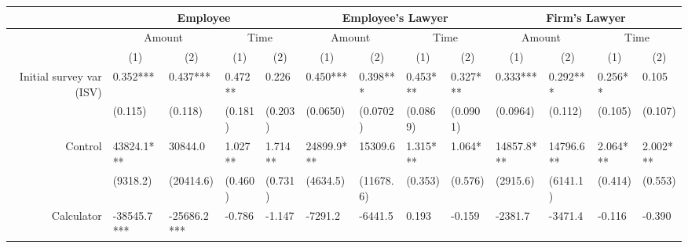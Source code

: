 \begin{tabular}{rrrrrrrrrrrrr}
\toprule
      & \multicolumn{4}{c}{Employee}  & \multicolumn{4}{c}{Employee's Lawyer} & \multicolumn{4}{c}{Firm's Lawyer} \\
\midrule
      & \multicolumn{2}{c}{Amount} & \multicolumn{2}{c}{Time} & \multicolumn{2}{c}{Amount} & \multicolumn{2}{c}{Time} & \multicolumn{2}{c}{Amount} & \multicolumn{2}{c}{Time} \\
      & \multicolumn{1}{c}{(1)} & \multicolumn{1}{c}{(2)} & \multicolumn{1}{c}{(1)} & \multicolumn{1}{c}{(2)} & \multicolumn{1}{c}{(1)} & \multicolumn{1}{c}{(2)} & \multicolumn{1}{c}{(1)} & \multicolumn{1}{c}{(2)} & \multicolumn{1}{c}{(1)} & \multicolumn{1}{c}{(2)} & \multicolumn{1}{c}{(1)} & \multicolumn{1}{c}{(2)} \\
Initial survey var (ISV) & \multicolumn{1}{l}{0.352***} & \multicolumn{1}{l}{0.437***} & \multicolumn{1}{l}{0.472**} & \multicolumn{1}{l}{0.226} & \multicolumn{1}{l}{0.450***} & \multicolumn{1}{l}{0.398***} & \multicolumn{1}{l}{0.453***} & \multicolumn{1}{l}{0.327***} & \multicolumn{1}{l}{0.333***} & \multicolumn{1}{l}{0.292***} & \multicolumn{1}{l}{0.256**} & \multicolumn{1}{l}{0.105} \\
      & \multicolumn{1}{l}{(0.115)} & \multicolumn{1}{l}{(0.118)} & \multicolumn{1}{l}{(0.181)} & \multicolumn{1}{l}{(0.203)} & \multicolumn{1}{l}{(0.0650)} & \multicolumn{1}{l}{(0.0702)} & \multicolumn{1}{l}{(0.0869)} & \multicolumn{1}{l}{(0.0901)} & \multicolumn{1}{l}{(0.0964)} & \multicolumn{1}{l}{(0.112)} & \multicolumn{1}{l}{(0.105)} & \multicolumn{1}{l}{(0.107)} \\
Control & \multicolumn{1}{l}{43824.1***} & \multicolumn{1}{l}{30844.0} & \multicolumn{1}{l}{1.027**} & \multicolumn{1}{l}{1.714**} & \multicolumn{1}{l}{24899.9***} & \multicolumn{1}{l}{15309.6} & \multicolumn{1}{l}{1.315***} & \multicolumn{1}{l}{1.064*} & \multicolumn{1}{l}{14857.8***} & \multicolumn{1}{l}{14796.6**} & \multicolumn{1}{l}{2.064***} & \multicolumn{1}{l}{2.002***} \\
      & \multicolumn{1}{l}{(9318.2)} & \multicolumn{1}{l}{(20414.6)} & \multicolumn{1}{l}{(0.460)} & \multicolumn{1}{l}{(0.731)} & \multicolumn{1}{l}{(4634.5)} & \multicolumn{1}{l}{(11678.6)} & \multicolumn{1}{l}{(0.353)} & \multicolumn{1}{l}{(0.576)} & \multicolumn{1}{l}{(2915.6)} & \multicolumn{1}{l}{(6141.1)} & \multicolumn{1}{l}{(0.414)} & \multicolumn{1}{l}{(0.553)} \\
Calculator & \multicolumn{1}{l}{-38545.7***} & \multicolumn{1}{l}{-25686.2***} & \multicolumn{1}{l}{-0.786} & \multicolumn{1}{l}{-1.147} & \multicolumn{1}{l}{-7291.2} & \multicolumn{1}{l}{-6441.5} & \multicolumn{1}{l}{0.193} & \multicolumn{1}{l}{-0.159} & \multicolumn{1}{l}{-2381.7} & \multicolumn{1}{l}{-3471.4} & \multicolumn{1}{l}{-0.116} & \multicolumn{1}{l}{-0.390} \\

\end{tabular}
